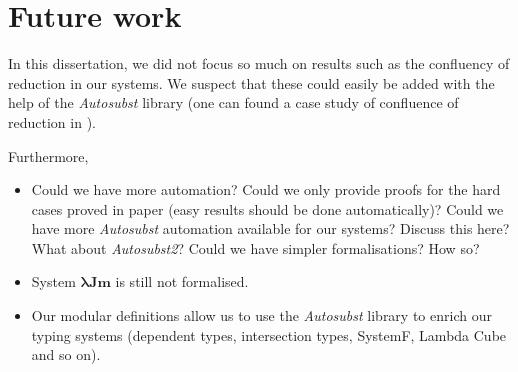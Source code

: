 
\section{Future work}

In this dissertation, we did not focus so much on results such as the confluency of reduction in our systems.
We suspect that these could easily be added with the help of the \textit{Autosubst} library (one can found a case study of confluence of reduction in \cite[Section~2.2]{AutosubstSchafer}).

Furthermore,
\begin{itemize}
\item Could we have more automation?
  \subitem Could we only provide proofs for the hard cases proved in paper (easy results should be done automatically)?
  \subitem Could we have more \textit{Autosubst} automation available for our systems? Discuss this here? What about \textit{Autosubst2}?
  \subitem Could we have simpler formalisations? How so?
\item System $\pmb{\lambda Jm}$ is still not formalised.
\item Our modular definitions allow us to use the \textit{Autosubst} library to enrich our typing systems (dependent types, intersection types, SystemF, Lambda Cube and so on).

\end{itemize}

\begin{comment}
Mechanisations in relation with the formalisations on the paper.
\begin{itemize}
\item Some ideas for the metatheory formalised come from attempts of mechanisations.
\item The metatheory mechanised does not correspond exactly to the formalised in the literature.
  \subitem An example: the polymorphic definition for system  $\LamM$.
\end{itemize}

Further work?
\begin{itemize}
\item Because of the modularity and of the \textit{Autosubst} library we have the facility to enrich our typing systems (ex: SystemF?).
\item Could there be more automation?  
\item Why use a outdated library for mechanising binders? What about \textit{Autosubst 2}?
\item Obstacles on the mechanisation of a non standard substitution operation.
\item SSreflect style proofs for \textit{Rocq Prover}.
\end{itemize}
\end{comment}
